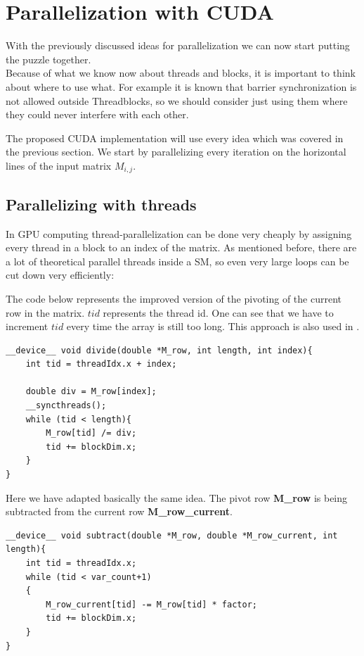 \documentclass[draft, final]{vutinfth} %
\begin{document}
	\section{Parallelization with CUDA}
		With the previously discussed ideas for parallelization we can now start putting the puzzle together.\\
		Because of what we know now about threads and blocks, it is important to think about where to use what. For example it is known that barrier synchronization is not allowed outside Threadblocks, so we should consider just using them where they could never interfere with each other.

		The proposed CUDA implementation will use every idea which was covered in the previous section. We start by parallelizing every iteration on the horizontal lines of the input matrix $M_{i,j}$.\\

		\subsection{Parallelizing with threads}
			In GPU computing thread-parallelization can be done very cheaply by assigning every thread in a block to an index of the matrix. As mentioned before, there are a lot of theoretical parallel threads inside a SM, so even very large loops can be cut down very efficiently:

			The code below represents the improved version of the pivoting of the current row in the matrix. $tid$ represents the thread id. One can see that we have to increment $tid$ every time the array is still too long. This approach is also used in \cite{Sanders:2010:CEI:1891996}.
			\begin{lstlisting}
__device__ void divide(double *M_row, int length, int index){
	int tid = threadIdx.x + index;

	double div = M_row[index];
	__syncthreads();
	while (tid < length){
		M_row[tid] /= div;
		tid += blockDim.x;
	}
}
			\end{lstlisting}

			Here we have adapted basically the same idea. The pivot row \textbf{M\_row} is being subtracted from the current row \textbf{M\_row\_current}.
			\begin{lstlisting}
__device__ void subtract(double *M_row, double *M_row_current, int length){
    int tid = threadIdx.x;
	while (tid < var_count+1)
	{
		M_row_current[tid] -= M_row[tid] * factor;
		tid += blockDim.x;
	}
}
			\end{lstlisting}
\end{document}
